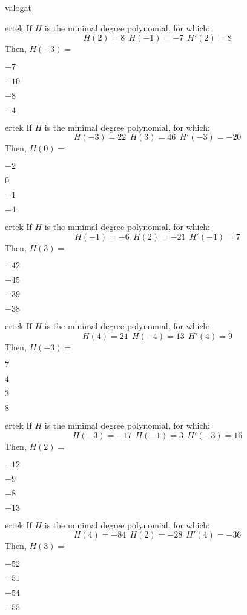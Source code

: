 \documentclass[12pt]{article}
\begin{document}
\begin{quiz}{valogat}
\begin{multi}{ertek}
If $H$ is the minimal degree polynomial, for which:
$$
H(2)=8 \ \  H(-1)=-7 \ \ H'(2)=8
$$
Then, $H(-3)=$
\item* $ -7 $
\item  $ -10 $
\item  $ -8 $
\item  $ -4 $
\end{multi}
\begin{multi}{ertek}
If $H$ is the minimal degree polynomial, for which:
$$
H(-3)=22 \ \  H(3)=46 \ \ H'(-3)=-20
$$
Then, $H(0)=$
\item* $ -2 $
\item  $ 0 $
\item  $ -1 $
\item  $ -4 $
\end{multi}
\begin{multi}{ertek}
If $H$ is the minimal degree polynomial, for which:
$$
H(-1)=-6 \ \  H(2)=-21 \ \ H'(-1)=7
$$
Then, $H(3)=$
\item* $ -42 $
\item  $ -45 $
\item  $ -39 $
\item  $ -38 $
\end{multi}
\begin{multi}{ertek}
If $H$ is the minimal degree polynomial, for which:
$$
H(4)=21 \ \  H(-4)=13 \ \ H'(4)=9
$$
Then, $H(-3)=$
\item* $ 7 $
\item  $ 4 $
\item  $ 3 $
\item  $ 8 $
\end{multi}
\begin{multi}{ertek}
If $H$ is the minimal degree polynomial, for which:
$$
H(-3)=-17 \ \  H(-1)=3 \ \ H'(-3)=16
$$
Then, $H(2)=$
\item* $ -12 $
\item  $ -9 $
\item  $ -8 $
\item  $ -13 $
\end{multi}
\begin{multi}{ertek}
If $H$ is the minimal degree polynomial, for which:
$$
H(4)=-84 \ \  H(2)=-28 \ \ H'(4)=-36
$$
Then, $H(3)=$
\item* $ -52 $
\item  $ -51 $
\item  $ -54 $
\item  $ -55 $

\end{multi}
\end{quiz}
\end{document}

